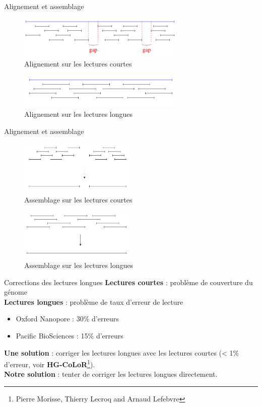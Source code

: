 \documentclass[11pt]{beamer}
\begin{document}
\begin{frame}[fragile]{Alignement et assemblage}
  \begin{figure}
    \includegraphics[width=80mm]{alignement_courts}
    \caption{Alignement sur les lectures courtes}
  \end{figure}
  \pause
  \begin{figure}
    \includegraphics[width=80mm]{alignement_longs}
    \caption{Alignement sur les lectures longues}
  \end{figure}
\end{frame}

\begin{frame}[fragile]{Alignement et assemblage}
  \begin{figure}
    \includegraphics[width=55mm]{assemblage_courts}
    \caption{Assemblage sur les lectures courtes}
  \end{figure}
  \pause
  \begin{figure}
    \includegraphics[width=55mm]{assemblage_longs}
    \caption{Assemblage sur les lectures longues}
  \end{figure}
\end{frame}

\begin{frame}[fragile]{Corrections des lectures longues}
  \textbf{Lectures courtes} : problème de couverture du génome\medskip\pause\\
  \textbf{Lectures longues} : problème de taux d'erreur de lecture\pause
  \begin{itemize}[<+-| alert@+>]
    \item Oxford Nanopore : 30\% d'erreurs
    \item Pacific BioSciences : 15\% d'erreurs
  \end{itemize}\pause
  \textbf{Une solution} : corriger les lectures longues avec les lectures courtes (< 1\% d'erreur, voir \textbf{HG-CoLoR}\footnote{Pierre Morisse, Thierry Lecroq and Arnaud Lefebvre\cite{Morisse2017}}).\medskip\pause\\
  \textbf{Notre solution} : tenter de corriger les lectures longues directement.
\end{frame}
\end{document}
